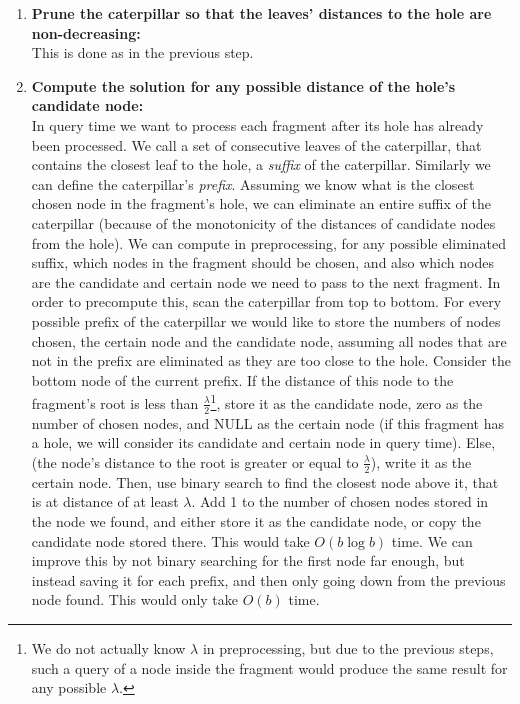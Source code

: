 \documentclass[11pt,a4paper]{article}
\theoremstyle{definition}
\theoremstyle{remark}
\begin{document}
\begin{enumerate}
\item \label{making distances from the hole monotone}
\textbf{Prune the caterpillar so that the leaves' distances to the hole are non-decreasing:}\\
This is done as in the previous step.
\item\textbf{Compute the solution for any possible distance of the hole's candidate node:}\\
In query time we want to process each fragment after its hole has already been processed.
We call a set of consecutive leaves of the caterpillar, that contains the closest leaf to the hole, a \emph{suffix} of the caterpillar. Similarly we can define the caterpillar's \emph{prefix}.
Assuming we know what is the closest chosen node in the fragment's hole, we can eliminate an entire suffix of the caterpillar (because of the monotonicity of the distances of candidate nodes from the hole). We can compute in preprocessing, for any possible eliminated suffix, which nodes in the fragment should be chosen, and also which nodes are the candidate and certain node we need to pass to the next fragment.
In order to precompute this, scan the caterpillar from top to bottom. For every possible prefix of the caterpillar we would like to store the numbers of nodes chosen, the certain node and the candidate node, assuming all nodes that are not in the prefix are eliminated as they are too close to the hole. Consider the bottom node of the current prefix. If the distance of this node to the fragment's root is less than $\frac{\lambda}{2}$\footnote{We do not actually know $\lambda$ in preprocessing, but due to the previous steps, such a query of a node inside the fragment would produce the same result for any possible $\lambda$.}, store it as the candidate node, zero as the number of chosen nodes, and NULL as the certain node (if this fragment has a hole, we will consider its candidate and certain node in query time). Else, (the node's distance to the root is greater or equal to $\frac{\lambda}{2}$), write it as the certain node. Then, use binary search to find the closest node above it, that is at distance of at least $\lambda$. Add 1 to the number of chosen nodes stored in the node we found, and either store it as the candidate node, or copy the candidate node stored there. This would take $O(b \log b)$ time. We can improve this by not binary searching for the first node far enough, but instead saving it for each prefix, and then only going down from the previous node found. This would only take $O(b)$ time.
\end{enumerate}
\end{document}
